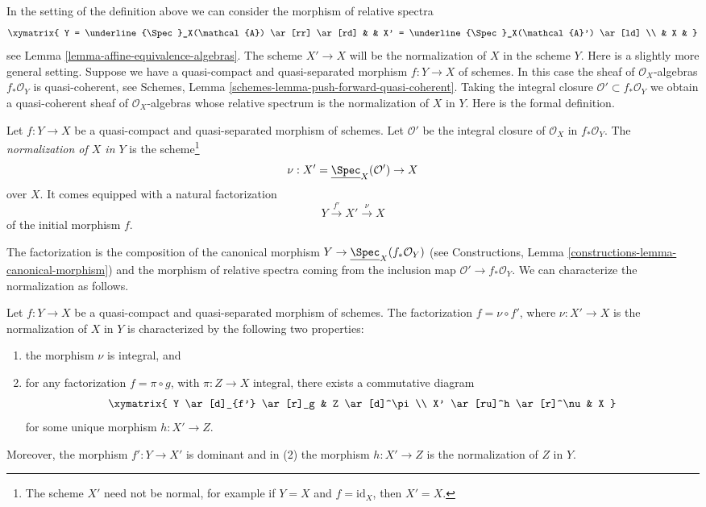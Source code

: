 \noindent
In the setting of the definition above we can consider the morphism
of relative spectra
$$
\xymatrix{
Y = \underline{\Spec}_X(\mathcal{A}) \ar[rr] \ar[rd] & &
X' = \underline{\Spec}_X(\mathcal{A}') \ar[ld] \\
& X &
}
$$
see Lemma \ref{lemma-affine-equivalence-algebras}.
The scheme $X' \to X$ will be the normalization of $X$ in the scheme $Y$.
Here is a slightly more general setting. Suppose we have a
quasi-compact and quasi-separated morphism $f : Y \to X$
of schemes. In this case the sheaf of
$\mathcal{O}_X$-algebras $f_*\mathcal{O}_Y$ is quasi-coherent, see
Schemes, Lemma \ref{schemes-lemma-push-forward-quasi-coherent}.
Taking the integral closure $\mathcal{O}' \subset f_*\mathcal{O}_Y$
we obtain a quasi-coherent sheaf of $\mathcal{O}_X$-algebras
whose relative spectrum is the normalization of $X$ in $Y$. Here is
the formal definition.

\begin{definition}
\label{definition-normalization-X-in-Y}
Let $f : Y \to X$ be a quasi-compact and quasi-separated morphism of schemes.
Let $\mathcal{O}'$ be the integral closure of $\mathcal{O}_X$ in
$f_*\mathcal{O}_Y$. The {\it normalization of $X$ in $Y$} is the
scheme\footnote{The scheme $X'$ need not be normal, for example if
$Y = X$ and $f = \text{id}_X$, then $X' = X$.}
$$
\nu : X' = \underline{\Spec}_X(\mathcal{O}') \to X
$$
over $X$. It comes equipped with a natural factorization
$$
Y \xrightarrow{f'} X' \xrightarrow{\nu} X
$$
of the initial morphism $f$.
\end{definition}

\noindent
The factorization is the composition of the canonical morphism
$Y \to \underline{\Spec}_X(f_*\mathcal{O}_Y)$ (see
Constructions, Lemma
\ref{constructions-lemma-canonical-morphism})
and the morphism of relative spectra coming from the inclusion map
$\mathcal{O}' \to f_*\mathcal{O}_Y$. We can characterize the
normalization as follows.

\begin{lemma}
\label{lemma-characterize-normalization}
Let $f : Y \to X$ be a quasi-compact and quasi-separated morphism of schemes.
The factorization $f = \nu \circ f'$, where $\nu : X' \to X$ is the
normalization of $X$ in $Y$ is characterized by the following
two properties:
\begin{enumerate}
\item the morphism $\nu$ is integral, and
\item for any factorization $f = \pi \circ g$, with $\pi : Z \to X$
integral, there exists a commutative diagram
$$
\xymatrix{
Y \ar[d]_{f'} \ar[r]_g & Z \ar[d]^\pi \\
X' \ar[ru]^h \ar[r]^\nu & X
}
$$
for some unique morphism $h : X' \to Z$.
\end{enumerate}
Moreover, the morphism $f' : Y \to X'$ is dominant and in (2) the
morphism $h : X' \to Z$ is the normalization of $Z$ in $Y$.
\end{lemma}

